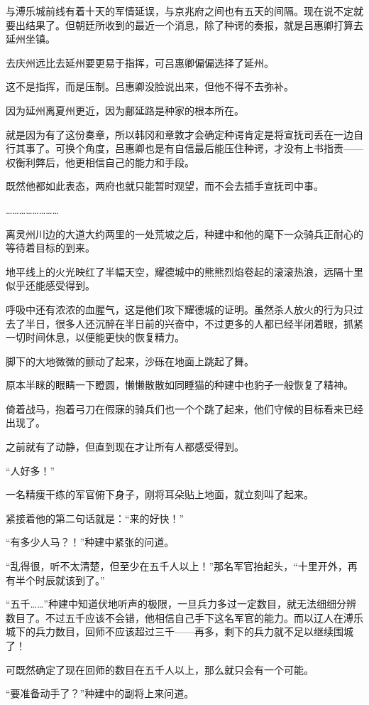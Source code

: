 与溥乐城前线有着十天的军情延误，与京兆府之间也有五天的间隔。现在说不定就要出结果了。但朝廷所收到的最近一个消息，除了种谔的奏报，就是吕惠卿打算去延州坐镇。

去庆州远比去延州要更易于指挥，可吕惠卿偏偏选择了延州。

这不是指挥，而是压制。吕惠卿没脸说出来，但他不得不去弥补。

因为延州离夏州更近，因为鄜延路是种家的根本所在。

就是因为有了这份奏章，所以韩冈和章敦才会确定种谔肯定是将宣抚司丢在一边自行其事了。可换个角度，吕惠卿也是有自信最后能压住种谔，才没有上书指责——权衡利弊后，他更相信自己的能力和手段。

既然他都如此表态，两府也就只能暂时观望，而不会去插手宣抚司中事。

……………………

离灵州川边的大道大约两里的一处荒坡之后，种建中和他的麾下一众骑兵正耐心的等待着目标的到来。

地平线上的火光映红了半幅天空，耀德城中的熊熊烈焰卷起的滚滚热浪，远隔十里似乎还能感受得到。

呼吸中还有浓浓的血腥气，这是他们攻下耀德城的证明。虽然杀人放火的行为只过去了半日，很多人还沉醉在半日前的兴奋中，不过更多的人都已经半闭着眼，抓紧一切时间休息，以便能更快的恢复精力。

脚下的大地微微的颤动了起来，沙砾在地面上跳起了舞。

原本半眯的眼睛一下瞪圆，懒懒散散如同睡猫的种建中也豹子一般恢复了精神。

倚着战马，抱着弓刀在假寐的骑兵们也一个个跳了起来，他们守候的目标看来已经出现了。

之前就有了动静，但直到现在才让所有人都感受得到。

“人好多！”

一名精瘦干练的军官俯下身子，刚将耳朵贴上地面，就立刻叫了起来。

紧接着他的第二句话就是：“来的好快！”

“有多少人马？！”种建中紧张的问道。

“乱得很，听不太清楚，但至少在五千人以上！”那名军官抬起头，“十里开外，再有半个时辰就该到了。”

“五千……”种建中知道伏地听声的极限，一旦兵力多过一定数目，就无法细细分辨数目了。不过五千应该不会错，他相信自己手下这名军官的能力。而以辽人在溥乐城下的兵力数目，回师不应该超过三千——再多，剩下的兵力就不足以继续围城了！

可既然确定了现在回师的数目在五千人以上，那么就只会有一个可能。

“要准备动手了？”种建中的副将上来问道。

